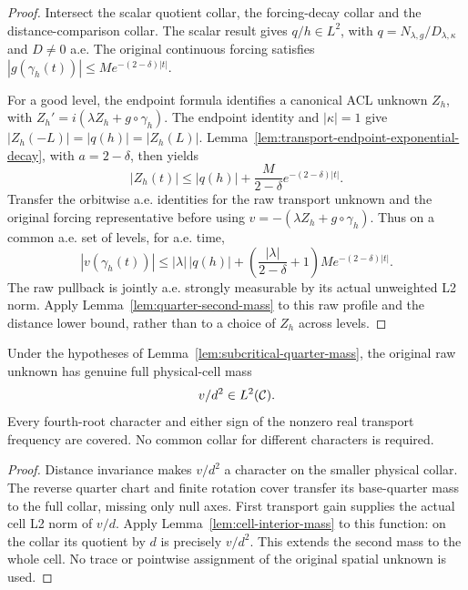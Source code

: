 \begin{proof}
\leanok
Intersect the scalar quotient collar, the forcing-decay collar and the
distance-comparison collar. The scalar result gives $q/h\in L^2$, with
$q=N_{\lambda,g}/D_{\lambda,\kappa}$ and $D\ne0$ a.e.
The original continuous forcing satisfies
$|g(\gamma_h(t))|\le Me^{-(2-\delta)|t|}$.

For a good level, the endpoint formula identifies a canonical ACL unknown
$Z_h$, with $Z_h'=i(\lambda Z_h+g\circ\gamma_h)$.
The endpoint identity and $|\kappa|=1$ give
$|Z_h(-L)|=|q(h)|=|Z_h(L)|$.
Lemma~\ref{lem:transport-endpoint-exponential-decay}, with $a=2-\delta$,
then yields
\[
 |Z_h(t)|\le |q(h)|+\frac M{2-\delta}e^{-(2-\delta)|t|}.
\]
Transfer the orbitwise a.e. identities for the raw transport unknown and
the original forcing representative before using
$v=-(\lambda Z_h+g\circ\gamma_h)$. Thus on a common a.e. set of levels,
for a.e. time,
\[
 |v(\gamma_h(t))|
 \le |\lambda|\,|q(h)|+
      \left(\frac{|\lambda|}{2-\delta}+1\right)M e^{-(2-\delta)|t|}.
\]
The raw pullback is jointly a.e. strongly measurable by its actual unweighted
L2 norm. Apply Lemma~\ref{lem:quarter-second-mass} to this raw profile and
the distance lower bound, rather than to a choice of $Z_h$ across levels.
\end{proof}

\begin{lemma}
\label{lem:subcritical-character-mass}
\leanok
Under the hypotheses of Lemma~\ref{lem:subcritical-quarter-mass},
the original raw unknown has genuine full physical-cell mass
\[
 v/d^2\in L^2(\mathcal{C}).
\]
Every fourth-root character and either sign of the nonzero real transport
frequency are covered. No common collar for different characters is required.
\end{lemma}

\begin{proof}
\leanok
Distance invariance makes $v/d^2$ a character on the smaller physical collar.
The reverse quarter chart and finite rotation cover transfer its base-quarter
mass to the full collar, missing only null axes.
First transport gain supplies the actual cell L2 norm of $v/d$.
Apply Lemma~\ref{lem:cell-interior-mass} to this function: on the collar
its quotient by $d$ is precisely $v/d^2$.
This extends the second mass to the whole cell.
No trace or pointwise assignment of the original spatial unknown is used.
\end{proof}


